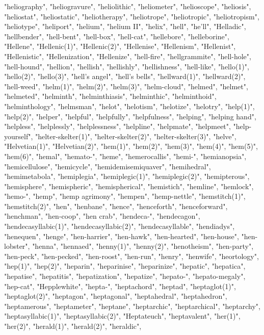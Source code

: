 "heliography",
"heliogravure",
"heliolithic",
"heliometer",
"helioscope",
"heliosis",
"heliostat",
"heliostatic",
"heliotherapy",
"heliotrope",
"heliotropic",
"heliotropism",
"heliotype",
"heliport",
"helium",
"helium II",
"helix",
"hell",
"he'll",
"Helladic",
"hellbender",
"hell-bent",
"hell-box",
"hell-cat",
"hellebore",
"helleborine",
"Hellene",
"Hellenic(1)",
"Hellenic(2)",
"Hellenise",
"Hellenism",
"Hellenist",
"Hellenistic",
"Hellenization",
"Hellenize",
"hell-fire",
"hellgrammite",
"hell-hole",
"hell-hound",
"hellion",
"hellish",
"hellishly",
"hellishness",
"hell-like",
"hello(1)",
"hello(2)",
"hello(3)",
"hell's angel",
"hell's bells",
"hellward(1)",
"hellward(2)",
"hell-weed",
"helm(1)",
"helm(2)",
"helm(3)",
"helm-cloud",
"helmed",
"helmet",
"helmeted",
"helminth",
"helminthiasis",
"helminthic",
"helminthoid",
"helminthology",
"helmsman",
"helot",
"helotism",
"helotize",
"helotry",
"help(1)",
"help(2)",
"helper",
"helpful",
"helpfully",
"helpfulness",
"helping",
"helping hand",
"helpless",
"helplessly",
"helplessness",
"helpline",
"helpmate",
"helpmeet",
"help-yourself",
"helter-skelter(1)",
"helter-skelter(2)",
"helter-skelter(3)",
"helve",
"Helvetian(1)",
"Helvetian(2)",
"hem(1)",
"hem(2)",
"hem(3)",
"hem(4)",
"hem(5)",
"hem(6)",
"hemal",
"hemato-",
"heme",
"hemerocallis",
"hemi-",
"hemianopsia",
"hemicellulose",
"hemicycle",
"hemidemisemiquaver",
"hemihedral",
"hemimetabola",
"hemiplegia",
"hemiplegic(1)",
"hemiplegic(2)",
"hemipterous",
"hemisphere",
"hemispheric",
"hemispherical",
"hemistich",
"hemline",
"hemlock",
"hemo-",
"hemp",
"hemp agrimony",
"hempen",
"hemp-nettle",
"hemstitch(1)",
"hemstitch(2)",
"hen",
"henbane",
"hence",
"henceforth",
"henceforward",
"henchman",
"hen-coop",
"hen crab",
"hendeca-",
"hendecagon",
"hendecasyllabic(1)",
"hendecasyllabic(2)",
"hendecasyllable",
"hendiadys",
"henequen",
"henge",
"hen-harrier",
"hen-hawk",
"hen-hearted",
"hen-house",
"hen-lobster",
"henna",
"hennaed",
"henny(1)",
"henny(2)",
"henotheism",
"hen-party",
"hen-peck",
"hen-pecked",
"hen-roost",
"hen-run",
"henry",
"henwife",
"heortology",
"hep(1)",
"hep(2)",
"heparin",
"heparinise",
"heparinize",
"hepatic",
"hepatica",
"hepatise",
"hepatitis",
"hepatization",
"hepatize",
"hepato-",
"hepato-megaly",
"hep-cat",
"Hepplewhite",
"hepta-",
"heptachord",
"heptad",
"heptaglot(1)",
"heptaglot(2)",
"heptagon",
"heptagonal",
"heptahedral",
"heptahedron",
"heptamerous",
"heptameter",
"heptane",
"heptarchic",
"heptarchical",
"heptarchy",
"heptasyllabic(1)",
"heptasyllabic(2)",
"Heptateuch",
"heptavalent",
"her(1)",
"her(2)",
"herald(1)",
"herald(2)",
"heraldic",
